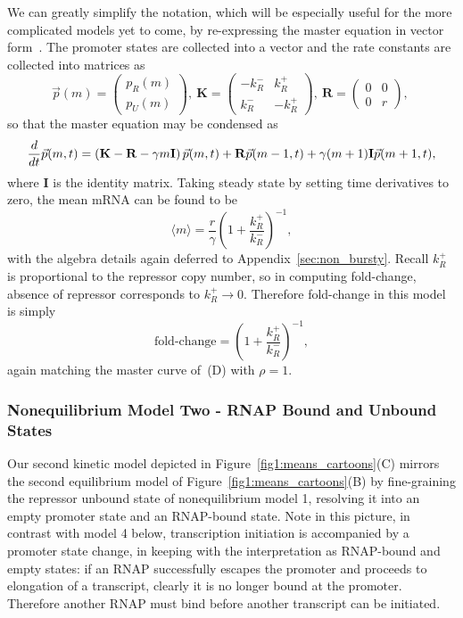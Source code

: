 We can greatly simplify the notation, which will be especially useful for the
more complicated models yet to come, by re-expressing the master equation in
vector form~\cite{Phillips2012}. The promoter states are collected into a vector
and the rate constants are collected into matrices as
\begin{equation}
\vec{p}(m) = \begin{pmatrix} p_R(m) \\ p_U(m) \end{pmatrix},\
\mathbf{K} = \begin{pmatrix} -k_R^- & k_R^+ \\ k_R^- & -k_R^+ \end{pmatrix},\
\mathbf{R} = \begin{pmatrix} 0 & 0 \\ 0 & r \end{pmatrix},\
\label{eq:2state_cme_matrices}
\end{equation}
so that the master equation may be condensed as
\begin{equation}
\frac{d {}}{d t}\vec{p}(m,t) =
\left( \mathbf{K} - \mathbf{R} - \gamma m \mathbf{I} \right) \vec{p}(m,t)
                + \mathbf{R} \vec{p}(m-1,t)
                + \gamma (m+1) \mathbf{I} \vec{p}(m+1,t),
\label{eq:2state_rep_cme}
\end{equation}
where $\mathbf{I}$ is the identity matrix. Taking steady state by setting time
derivatives to zero, the mean mRNA can be found to be
\begin{equation}
\langle m \rangle = \frac{r}{\gamma}
        \left(1 + \frac{k_R^+}{k_R^-}\right)^{-1},
\label{eq:mean_m_model1}
\end{equation}
with the algebra details again deferred to Appendix~\ref{sec:non_bursty}. Recall
$k_R^+$ is proportional to the repressor copy number, so in computing
fold-change, absence of repressor corresponds to $k_R^+\rightarrow0$. Therefore
fold-change in this model is simply
\begin{equation}
\text{fold-change} = \left(1 + \frac{k_R^+}{k_R^-}\right)^{-1},
\end{equation}
again matching the master curve of~(D) with $\rho=1$.

\subsubsection{Nonequilibrium Model Two - RNAP Bound and Unbound States}
Our second kinetic model depicted in Figure~\ref{fig1:means_cartoons}(C) mirrors
the second equilibrium model of Figure~\ref{fig1:means_cartoons}(B) by
fine-graining  the repressor unbound state of nonequilibrium model 1, resolving
it into an empty promoter state and an RNAP-bound state. Note in this picture,
in contrast with model 4 below, transcription initiation is accompanied by a
promoter state change, in keeping with the interpretation as RNAP-bound and
empty states: if an RNAP successfully escapes the promoter and proceeds to
elongation of a transcript, clearly it is no longer bound at the promoter.
Therefore another RNAP must bind before another transcript can be initiated.

